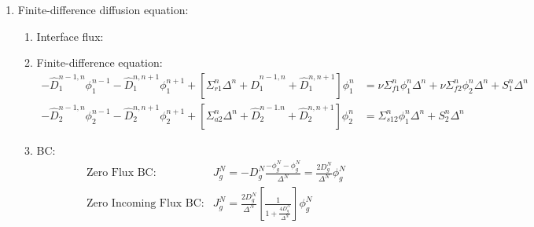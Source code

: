 \documentclass{school-22.211-notes}
\begin{document}
\begin{enumerate}
\begin{enumerate}
\end{enumerate} %
\end{enumerate} %


\clearpage
{}
\begin{enumerate}
\item Finite-difference diffusion equation: 
  \begin{enumerate}
  \item Interface flux: 

  \item Finite-difference equation: 
    \begin{align*}
      - \hat{D}_1^{n-1,n} \phi_1^{n-1} - \hat{D}_1^{n,n+1} \phi_1^{n+1} + [ \Sigma_{r1}^n \Delta^n + \hat{D}_1^{n-1, n} + \hat{D}_1^{n,n+1} ] \phi_1^n 
      &= \nu \Sigma_{f1}^n \phi_1^n \Delta^n + \nu \Sigma_{f2}^n \phi_2^n \Delta^n + S_1^n \Delta^n \\
      - \hat{D}_2^{n-1,n} \phi_2^{n-1} - \hat{D}_2^{n,n+1} \phi_2^{n+1} + [\Sigma_{a2}^n \Delta^n + \hat{D}_2^{n-1.n} + \hat{D}_2^{n,n+1} ] \phi_2^n 
      &= \Sigma_{s12}^n \phi_1^n \Delta^n + S_2^n \Delta^n 
    \end{align*}

  \item BC: 
    \begin{align}
      \mbox{Zero Flux BC:} & J_g^N = -D_g^N \frac{ -\phi_g^N - \phi_g^N}{\Delta^N}  = \frac{2 D_g^N}{\Delta^N} \phi_g^N \\
      \mbox{Zero Incoming Flux BC:} & J_g^N = \frac{2D_g^N}{\Delta^N} \left[ \frac{1}{1 + \frac{4 D_g^N}{\Delta^N}} \right] \phi_g^N 
    \end{align}


\end{enumerate}
\end{enumerate}
\end{document}
